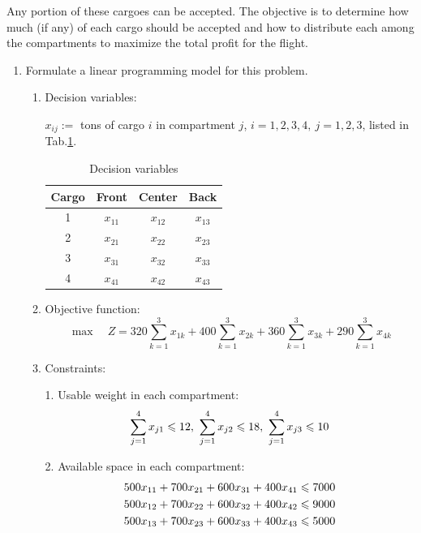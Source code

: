 \documentclass[a4paper]{article}
\begin{document}
\begin{enumerate}
Any portion of these cargoes can be accepted. The objective is to determine how much (if any) of each cargo should be accepted and how to distribute each among the compartments to maximize the total profit for the flight.
\begin{enumerate}
	\item Formulate a linear programming model for this problem.
	\begin{enumerate}
		\item Decision variables:
		
		$x_{ij}:=$ tons of cargo $i$ in compartment $j$, $i=1,2,3,4,\ j=1,2,3$, listed in Tab.\ref{tab1}.
			\begin{table}[h]
				\centering
				\caption{Decision variables}
				\label{tab1}
				\begin{tabular}{cccc}
					\toprule[1.5pt]
					Cargo&Front&Center&Back\\
					\midrule[0.5pt]
					1&$x_{11}$&$x_{12}$&$x_{13}$\\
					2&$x_{21}$&$x_{22}$&$x_{23}$\\
					3&$x_{31}$&$x_{32}$&$x_{33}$\\
					4&$x_{41}$&$x_{42}$&$x_{43}$\\
					\bottomrule[1.5pt]
				\end{tabular}
			\end{table}
		\item Objective function:
		\begin{equation*}
		\max \quad	Z=320\sum_{k=1}^{3}x_{1k}+400\sum_{k=1}^{3}x_{2k}+360\sum_{k=1}^{3}x_{3k}+290\sum_{k=1}^{3}x_{4k}
		\end{equation*}
		\item Constraints:
		
		1. Usable weight in each compartment:
		\begin{equation*}
		\sum_{j=1}^{4}x_{j1}\ls 12,\ \sum_{j=1}^{4}x_{j2}\ls 18,\ \sum_{j=1}^{4}x_{j3}\ls 10
		\end{equation*}
		
		2. Available space in each compartment:
		\begin{equation*}
		\begin{aligned}
		500 x_{11}+700x_{21}+600x_{31}+400x_{41}&\leqslant 7000\\
		500 x_{12}+700x_{22}+600x_{32}+400x_{42}&\leqslant 9000\\
		500 x_{13}+700x_{23}+600x_{33}+400x_{43}&\leqslant 5000\\
		\end{aligned}
		\end{equation*}
		

\end{enumerate}
\end{enumerate}
\end{enumerate}
\end{document}
